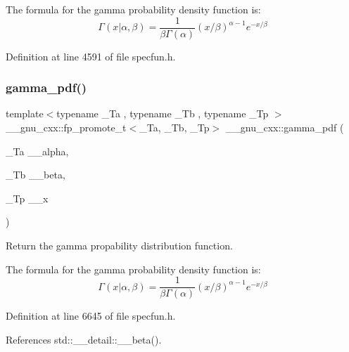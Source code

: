 The formula for the gamma probability density function is\+: \[ \Gamma(x|\alpha,\beta) = \frac{1}{\beta\Gamma(\alpha)} (x/\beta)^{\alpha - 1} e^{-x/\beta} \] 

Definition at line 4591 of file specfun.\+h.

\mbox{\label{group__mathsf__gnu_ga55f530c37387a6c10c601c5838f3be00}} 
\subsubsection{\texorpdfstring{gamma\+\_\+pdf()}{gamma\_pdf()}}
{\footnotesize\ttfamily template$<$typename \+\_\+\+Ta , typename \+\_\+\+Tb , typename \+\_\+\+Tp $>$ \\
\+\_\+\+\_\+gnu\+\_\+cxx\+::fp\+\_\+promote\+\_\+t$<$\+\_\+\+Ta, \+\_\+\+Tb, \+\_\+\+Tp$>$ \+\_\+\+\_\+gnu\+\_\+cxx\+::gamma\+\_\+pdf (\begin{DoxyParamCaption}\item[{\+\_\+\+Ta}]{\+\_\+\+\_\+alpha,  }\item[{\+\_\+\+Tb}]{\+\_\+\+\_\+beta,  }\item[{\+\_\+\+Tp}]{\+\_\+\+\_\+x }\end{DoxyParamCaption})\hspace{0.3cm}{\ttfamily [inline]}}



Return the gamma propability distribution function. 

The formula for the gamma probability density function is\+: \[ \Gamma(x|\alpha,\beta) = \frac{1}{\beta\Gamma(\alpha)} (x/\beta)^{\alpha - 1} e^{-x/\beta} \] 

Definition at line 6645 of file specfun.\+h.



References std\+::\+\_\+\+\_\+detail\+::\+\_\+\+\_\+beta().

\mbox{\label{group__mathsf__gnu_gac9a59be05877d3c14fa95bebcf15e8df}} 
